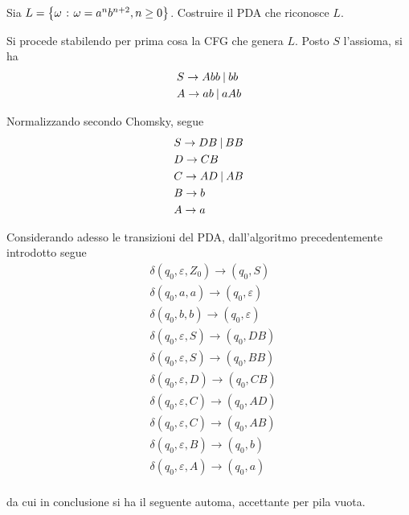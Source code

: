 \documentclass{subfiles}
\begin{document}
\begin{Exercise*}
    Sia \(L = \left\{\omega \operatorname{\: {:} \:} \omega = a^{n}b^{n + 2}, n \ge 0\right\}\). Costruire il PDA che riconosce \(L\).
    \begin{Solution*}
        Si procede stabilendo per prima cosa la CFG che genera \(L\). Posto \(S\) l'assioma, si ha
        \[\begin{aligned}
                 & S \to Abb \:{|}\: bb \\
                 & A \to ab \:{|}\: aAb \\
            \end{aligned}\]

        \noindent Normalizzando secondo Chomsky, segue
        \[\begin{aligned}
                 & S \to DB \:{|}\: BB \\
                 & D \to CB           \\
                 & C \to AD \:{|}\: AB \\
                 & B \to b            \\
                 & A \to a            \\
            \end{aligned}\]

        \noindent Considerando adesso le transizioni del PDA, dall'algoritmo precedentemente introdotto segue
        \[\begin{aligned}
                 & \delta(q_{0}, \varepsilon, Z_{0}) \to (q_{0}, S) \\
                 & \delta(q_{0}, a, a) \to (q_{0}, \varepsilon)     \\
                 & \delta(q_{0}, b, b) \to (q_{0}, \varepsilon)     \\
                 & \delta(q_{0}, \varepsilon, S) \to (q_{0}, DB)    \\
                 & \delta(q_{0}, \varepsilon, S) \to (q_{0}, BB)    \\
                 & \delta(q_{0}, \varepsilon, D) \to (q_{0}, CB)    \\
                 & \delta(q_{0}, \varepsilon, C) \to (q_{0}, AD)    \\
                 & \delta(q_{0}, \varepsilon, C) \to (q_{0}, AB)    \\
                 & \delta(q_{0}, \varepsilon, B) \to (q_{0}, b)     \\
                 & \delta(q_{0}, \varepsilon, A ) \to (q_{0}, a)    \\
            \end{aligned}\]

        \noindent da cui in conclusione si ha il seguente automa, accettante per pila vuota.
        
    \end{Solution*}
\end{Exercise*}

\clearpage
\end{document}
